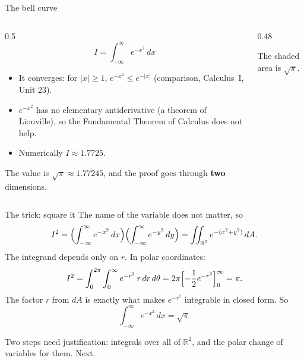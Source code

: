 \documentclass[10pt]{wosm-slides}
\newcommand{\R}{\mathbb{R}}
\newcommand{\dA}{\, dA}
\begin{document}
\begin{frame}{The bell curve}
  \begin{columns}[c]
    \begin{column}{0.5\textwidth}
      \[ I = \int_{-\infty}^{\infty} e^{-x^2}\, dx \]
      \begin{itemize}
        \item It converges: for $|x| \ge 1$, $e^{-x^2} \le e^{-|x|}$ (comparison, Calculus~I, Unit 23).
        \item $e^{-x^2}$ has no elementary antiderivative (a theorem of Liouville), so the Fundamental
          Theorem of Calculus does not help.
        \item Numerically $I \approx 1.7725$.
      \end{itemize}
      \pause
      The value is $\sqrt\pi \approx 1.77245$, and the proof goes through \textbf{two} dimensions.
    \end{column}
    \begin{column}{0.48\textwidth}
      \centering
      \par\small The shaded area is $\sqrt\pi$.
    \end{column}
  \end{columns}
\end{frame}

\begin{frame}{The trick: square it}
  The name of the variable does not matter, so
  \[ I^2 = \Bigl(\int_{-\infty}^\infty e^{-x^2}\, dx\Bigr) \Bigl(\int_{-\infty}^\infty e^{-y^2}\, dy\Bigr)
         = \iint_{\R^2} e^{-(x^2 + y^2)} \dA . \]
  \pause
  The integrand depends only on $r$. In polar coordinates:
  \[ I^2 = \int_0^{2\pi} \int_0^\infty e^{-r^2}\, r\, dr\, d\theta
         = 2\pi \Bigl[-\frac12 e^{-r^2}\Bigr]_0^\infty = \pi . \]
  \pause
  The factor $r$ from $dA$ is exactly what makes $e^{-r^2}$ integrable in closed form. So
  \[ \boxed{\int_{-\infty}^{\infty} e^{-x^2}\, dx = \sqrt\pi} \]
  {\small Two steps need justification: integrals over all of $\R^2$, and the polar change of
  variables for them. Next.\par}
\end{frame}
\end{document}

